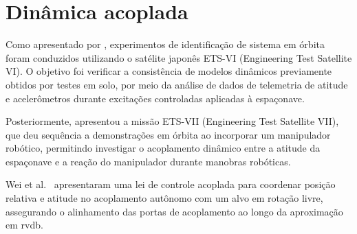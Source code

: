 \section{Dinâmica acoplada}
\label{sec_dinamica_acoplada_rev_bibliografica}


Como apresentado por \cite{adachi1999}, experimentos de identificação de sistema em órbita foram conduzidos utilizando o satélite japonês ETS-VI (Engineering Test Satellite VI).
O objetivo foi verificar a consistência de modelos dinâmicos previamente obtidos por testes em solo, por meio da análise de dados de telemetria de atitude e acelerômetros durante excitações controladas aplicadas à espaçonave.

Posteriormente, \cite{yoshida2003} apresentou a missão ETS-VII (Engineering Test Satellite VII), que deu sequência a demonstrações em órbita ao incorporar um manipulador robótico, permitindo investigar o acoplamento dinâmico entre a atitude da espaçonave e a reação do manipulador durante manobras robóticas.

Wei et al.~\cite{wei2011} apresentaram uma lei de controle acoplada para coordenar posição relativa e atitude no acoplamento autônomo com um alvo em rotação livre, assegurando o alinhamento das portas de acoplamento ao longo da aproximação em \gls{rvdb}.